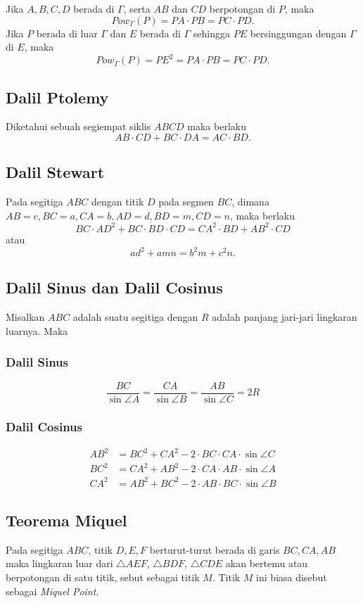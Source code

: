     Jika $A,B,C,D$ berada di $\Gamma$, serta $AB$ dan $CD$ berpotongan di $P$, maka $$Pow_\Gamma(P)=PA \cdot PB = PC \cdot PD.$$
    Jika $P$ berada di luar $\Gamma$ dan $E$ berada di $\Gamma$ sehingga $PE$ bersinggungan dengan $\Gamma$ di $E$, maka $$Pow_\Gamma (P) = PE^2 =  PA \cdot PB = PC \cdot PD.$$
    
    \subsection{Dalil Ptolemy}
        Diketahui sebuah segiempat siklis $ABCD$ maka berlaku
        $$AB \cdot CD + BC \cdot DA = AC \cdot BD.$$
        
    \subsection{Dalil Stewart}
        Pada segitiga $ABC$ dengan titik $D$ pada segmen $BC$, dimana $AB=c, BC=a, CA=b, AD=d, BD=m, CD=n$, maka berlaku
        $$BC \cdot AD^2 + BC \cdot BD \cdot CD = CA^2 \cdot BD + AB^2 \cdot CD$$
        atau $$ad^2+amn = b^2m+c^2n.$$
        
    \subsection{Dalil Sinus dan Dalil Cosinus}
        Misalkan $ABC$ adalah suatu segitiga dengan $R$ adalah panjang jari-jari lingkaran luarnya. Maka
        \subsubsection{Dalil Sinus}
        $$\dfrac{BC}{\sin \angle A} = \dfrac{CA}{\sin \angle B}= \dfrac{AB}{\sin \angle C} = 2R$$
        
        \subsubsection{Dalil Cosinus}
        \begin{align*}
            AB^2 &= BC^2 + CA^2 - 2\cdot BC \cdot CA \cdot \sin \angle C\\
            BC^2 &= CA^2 + AB^2 - 2\cdot CA \cdot AB \cdot \sin \angle A\\
            CA^2 &= AB^2 + BC^2 - 2\cdot AB \cdot BC \cdot \sin \angle B
        \end{align*}
        
        
    \subsection{Teorema Miquel}
        Pada segitiga $ABC$, titik $D,E,F$ berturut-turut berada di garis $BC,CA,AB$ maka lingkaran luar dari $\triangle AEF$, $\triangle  BDF$, $\triangle CDE$ akan bertemu atau berpotongan di satu titik, sebut sebagai titik $M$. Titik $M$ ini biasa disebut sebagai \textit{Miquel Point}.
        
